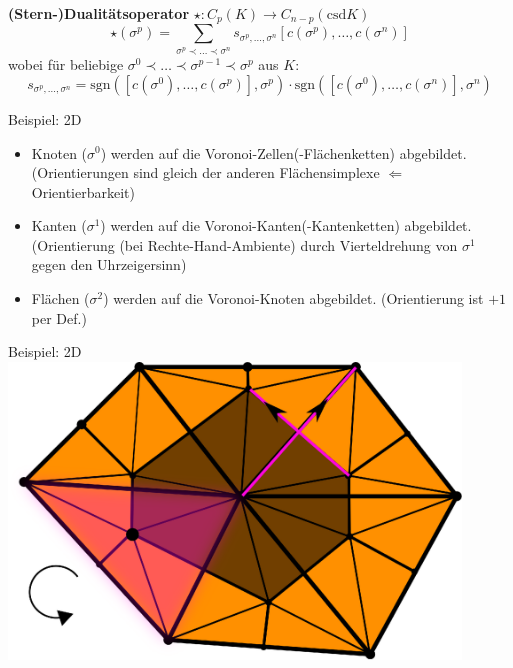 \documentclass{beamer}
\begin{document}
  \begin{frame}
    \begin{block}{\textbf{(Stern-)Dualitätsoperator} \( \star: C_{p}(K) \longrightarrow C_{n-p}(\text{csd}K) \)}
      \[ \star(\sigma^{p}) = \sum_{\sigma^{p} \prec \ldots \prec \sigma^{n}} s_{\sigma^{p},\ldots,\sigma^{n}} \left[ c(\sigma^{p}),\ldots,c(\sigma^{n}) \right]  \]
      wobei für beliebige \( \sigma^{0} \prec \ldots \prec \sigma^{p-1} \prec \sigma^{p} \) aus \( K \):
      \[ s_{\sigma^{p},\ldots,\sigma^{n}} = \text{sgn}\left( \left[ c(\sigma^{0}),\ldots,c(\sigma^{p}) \right], \sigma^{p} \right) 
                                      \cdot \text{sgn}\left( \left[ c(\sigma^{0}),\ldots,c(\sigma^{n}) \right], \sigma^{n} \right) \]
    \end{block}
    \pause
    \begin{block}{Beispiel: 2D}
      \begin{itemize}
        \item<2-> Knoten (\( \sigma^{0} \)) werden auf die  Voronoi-\glqq Zellen\grqq (-Flächenketten) abgebildet.
          (Orientierungen sind gleich der anderen Flächensimplexe \(\Leftarrow\) Orientierbarkeit) 
        \item<3-> Kanten (\( \sigma^{1} \)) werden auf die Voronoi-\glqq Kanten\grqq (-Kantenketten) abgebildet.
          (Orientierung (bei Rechte-Hand-Ambiente) durch Vierteldrehung von \( \sigma^{1} \) gegen den Uhrzeigersinn)
        \item<4-> Flächen (\( \sigma^{2} \)) werden auf die Voronoi-Knoten abgebildet. (Orientierung ist \( +1 \) per Def.)
      \end{itemize}
    \end{block}
  \end{frame}
    
  \begin{frame}
    \begin{block}{Beispiel: 2D}
      \centering\includegraphics[width=0.9\textwidth]{bilder/inkscape/dualSigma0.eps}
    \end{block}
  \end{frame}
\end{document}
